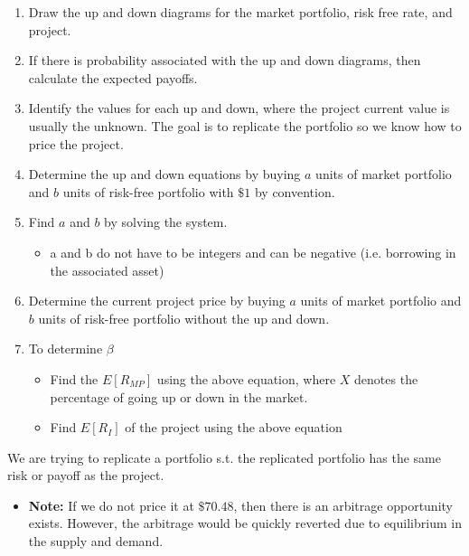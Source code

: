 \begin{process}
    \begin{enumerate}
        \item Draw the up and down diagrams for the market portfolio, risk free rate, and project.
        \item If there is probability associated with the up and down diagrams, then calculate the expected payoffs. 
        \item Identify the values for each up and down, where the project current value is usually the unknown. The goal is to replicate the portfolio so we know how to price the project. 
        \item Determine the up and down equations by buying $a$ units of market portfolio and $b$ units of risk-free portfolio with $\$1$ by convention.
        \item Find $a$ and $b$ by solving the system. 
        \begin{itemize}
            \item a and b do not have to be integers and can be negative (i.e. borrowing in the associated asset)
        \end{itemize}
        \item Determine the current project price by buying $a$ units of market portfolio and $b$ units of risk-free portfolio without the up and down. 
        \item To determine $\beta$
        \begin{itemize}
            \item Find the $E[R_{MP}]$ using the above equation, where $X$ denotes the percentage of going up or down in the market.
            \item Find $E[R_I]$ of the project using the above equation
        \end{itemize}
    \end{enumerate}
\end{process}

\begin{example}
    We are trying to replicate a portfolio s.t. the replicated portfolio has the same risk or payoff as the project. 

    \begin{itemize}
        \item \textbf{Note:} If we do not price it at $\$70.48$, then there is an arbitrage opportunity exists. However, the arbitrage would be quickly reverted due to equilibrium in the supply and demand.
    \end{itemize}
\end{example}


